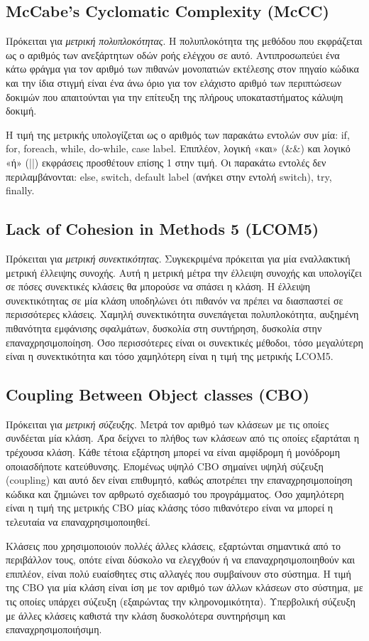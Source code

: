 \subsection{McCabe's Cyclomatic Complexity (McCC)}

Πρόκειται για \emph{μετρική πολυπλοκότητας}. Η πολυπλοκότητα της μεθόδου
που εκφράζεται ως ο αριθμός των ανεξάρτητων οδών ροής ελέγχου σε αυτό.
Αντιπροσωπεύει ένα κάτω φράγμα για τον αριθμό των πιθανών μονοπατιών
εκτέλεσης στον πηγαίο κώδικα και την ίδια στιγμή είναι ένα άνω όριο για
τον ελάχιστο αριθμό των περιπτώσεων δοκιμών που απαιτούνται για την
επίτευξη της πλήρους υποκαταστήματος κάλυψη δοκιμή.

Η τιμή της μετρικής υπολογίζεται ως ο αριθμός των παρακάτω εντολών συν
μία: if, for, foreach, while, do-while, case label. Επιπλέον, λογική «και»
(\&\&) και λογικό «ή» (||) εκφράσεις προσθέτουν επίσης 1 στην τιμή. Οι
παρακάτω εντολές δεν περιλαμβάνονται: else, switch, default label
(ανήκει στην εντολή switch), try, finally.


\subsection{Lack of Cohesion in Methods 5  (LCOM5)}

Πρόκειται για \emph{μετρική συνεκτικότητας}. Συγκεκριμένα πρόκειται για
μία εναλλακτική μετρική έλλειψης συνοχής. Αυτή η μετρική μέτρα την
έλλειψη συνοχής και υπολογίζει σε πόσες συνεκτικές κλάσεις θα μπορούσε
να σπάσει η κλάση. Η έλλειψη συνεκτικότητας σε μία κλάση υποδηλώνει ότι
πιθανόν να πρέπει να διασπαστεί σε περισσότερες κλάσεις. Χαμηλή
συνεκτικότητα συνεπάγεται πολυπλοκότητα, αυξημένη πιθανότητα εμφάνισης
σφαλμάτων, δυσκολία στη συντήρηση, δυσκολία στην επαναχρησιμοποίηση. Όσο
περισσότερες είναι οι συνεκτικές μέθοδοι, τόσο μεγαλύτερη είναι η
συνεκτικότητα και τόσο χαμηλότερη είναι η τιμή της μετρικής LCOM5.

\subsection{Coupling Between Object classes (CBO)}

Πρόκειται για \emph{μετρική σύζευξης}. Μετρά τον αριθμό των κλάσεων με
τις οποίες συνδέεται μία κλάση. Άρα δείχνει το πλήθος των κλάσεων από
τις οποίες εξαρτάται η τρέχουσα κλάση. Κάθε τέτοια εξάρτηση μπορεί να
είναι αμφίδρομη ή μονόδρομη οποιασδήποτε κατεύθυνσης. Επομένως υψηλό CBO
σημαίνει υψηλή σύζευξη (coupling) και αυτό δεν είναι επιθυμητό, καθώς
αποτρέπει την επαναχρησιμοποίηση κώδικα και ζημιώνει τον αρθρωτό
σχεδιασμό του προγράμματος. Όσο χαμηλότερη είναι η τιμή της μετρικής CBO
μίας κλάσης τόσο πιθανότερο είναι να μπορεί η τελευταία να
επαναχρησιμοποιηθεί. 

Κλάσεις που χρησιμοποιούν πολλές άλλες κλάσεις, εξαρτώνται σημαντικά από
το περιβάλλον τους, οπότε είναι δύσκολο να ελεγχθούν ή να
επαναχρησιμοποιηθούν και επιπλέον, είναι πολύ ευαίσθητες στις αλλαγές
που συμβαίνουν στο σύστημα. Η τιμή της CBO για μία κλάση είναι ίση με
τον αριθμό των άλλων κλάσεων στο σύστημα, με τις οποίες υπάρχει σύζευξη
(εξαιρώντας την κληρονομικότητα). Υπερβολική σύζευξη με άλλες κλάσεις
καθιστά την κλάση δυσκολότερα συντηρήσιμη και επαναχρησιμοποιήσιμη.
